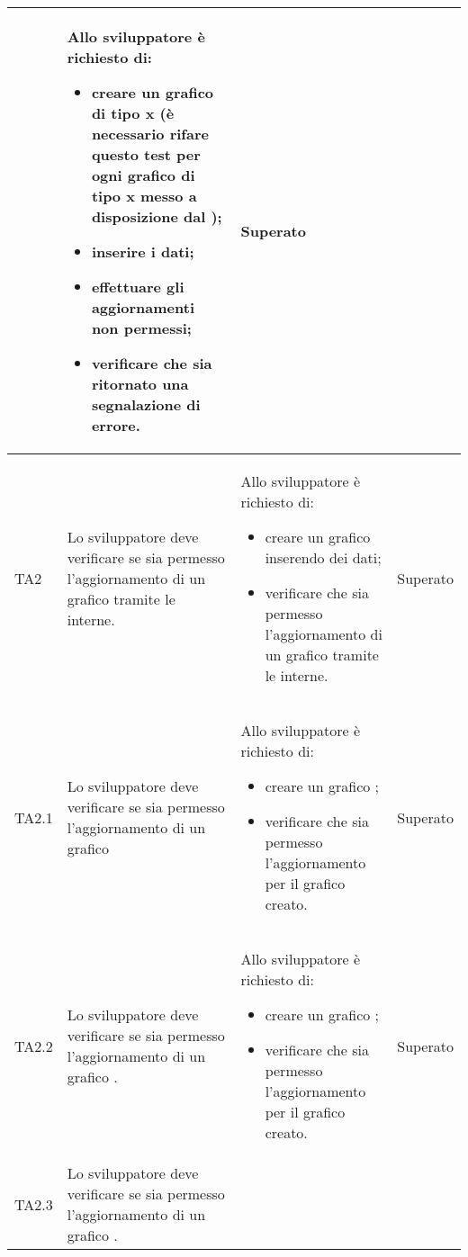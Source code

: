 \begin{longtabu}{| X[0.5] | X | X | X[0.5] |}
		& Allo sviluppatore è richiesto di:
		\begin{itemize}
			\item creare un grafico di tipo x (è necessario rifare questo test per ogni grafico di tipo x messo a disposizione dal );
			\item inserire i dati;
			\item effettuare gli aggiornamenti non permessi;
			\item verificare che sia ritornato una segnalazione di errore.
		\end{itemize}
& Superato \\ \hline

	TA2 & Lo sviluppatore deve verificare se sia permesso l'aggiornamento di un grafico tramite le  interne.
		
		& Allo sviluppatore è richiesto di:
		\begin{itemize}
			\item creare un grafico inserendo dei dati;
			\item verificare che sia permesso l'aggiornamento di un grafico tramite le  interne.
		\end{itemize}
& Superato \\ \hline

	TA2.1 & Lo sviluppatore deve verificare se sia permesso l'aggiornamento  di un grafico 
		
		& Allo sviluppatore è richiesto di:
		\begin{itemize}
			\item creare un grafico ;
			\item verificare che sia permesso l'aggiornamento  per il grafico creato.
		\end{itemize}
& Superato \\ \hline

	TA2.2 & Lo sviluppatore deve verificare se sia permesso l'aggiornamento di un grafico .
		
		& Allo sviluppatore è richiesto di:
		\begin{itemize}
			\item creare un grafico ;
			\item verificare che sia permesso l'aggiornamento  per il grafico creato.
		\end{itemize}
& Superato \\ \hline

	TA2.3 & Lo sviluppatore deve verificare se sia permesso l'aggiornamento  di un grafico .
		

\end{longtabu}
